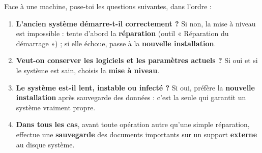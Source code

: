 \documentclass[11pt]{article}
\begin{document}
\begin{methode}
Face à une machine, pose-toi les questions suivantes, dans l'ordre :
\begin{enumerate}
\item \textbf{L'ancien système démarre-t-il correctement ?} Si non, la mise à niveau est impossible : tente d'abord la \textbf{réparation} (outil « Réparation du démarrage ») ; si elle échoue, passe à la \textbf{nouvelle installation}.
\item \textbf{Veut-on conserver les logiciels et les paramètres actuels ?} Si oui et si le système est sain, choisis la \textbf{mise à niveau}.
\item \textbf{Le système est-il lent, instable ou infecté ?} Si oui, préfère la \textbf{nouvelle installation} après sauvegarde des données : c'est la seule qui garantit un système vraiment propre.
\item \textbf{Dans tous les cas}, avant toute opération autre qu'une simple réparation, effectue une \textbf{sauvegarde} des documents importants sur un support \textbf{externe} au disque système.
\end{enumerate}
\end{methode}
\end{document}
